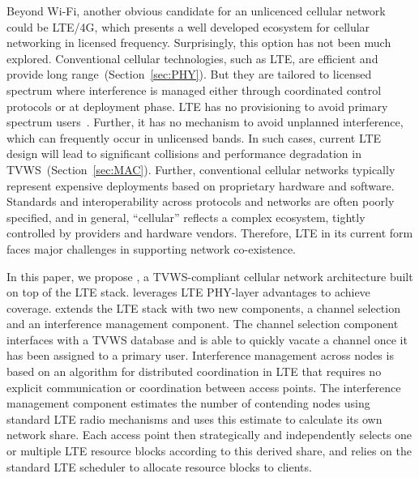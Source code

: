 Beyond Wi-Fi, another obvious candidate for an unlicenced cellular network could be LTE/4G, which presents a well developed ecosystem for cellular networking in licensed frequency. 
Surprisingly, this option has not been much explored. 
Conventional cellular technologies, such as LTE, are efficient and provide long range~(Section~\ref{sec:PHY}). 
But they are tailored to licensed spectrum where interference is managed either through coordinated control protocols or at deployment phase. 
LTE has no provisioning to avoid primary spectrum users~\cite{etsi_tvws}. 
Further, it has no mechanism to avoid unplanned interference, which can frequently occur in unlicensed bands.
In such cases, current LTE design will lead to significant collisions and performance degradation in TVWS~(Section~\ref{sec:MAC}).  
Further, conventional cellular networks typically represent expensive deployments based on proprietary hardware and software.
Standards and interoperability across protocols and networks are often poorly specified, 
and in general, ``cellular'' reflects a complex ecosystem, tightly controlled by providers and hardware vendors. 
Therefore, LTE in its current form faces major challenges in supporting network co-existence. 


In this paper, we propose {\em \cf}, a TVWS-compliant cellular network architecture built on top of the LTE stack. 
\cf leverages LTE PHY-layer advantages to achieve coverage. 
\cf extends the LTE stack with two new components, a channel selection and an interference management component. 
The channel selection component interfaces with a TVWS database and is able to quickly vacate a channel once it has been assigned to a primary user. 
Interference management across \cf nodes is based on an algorithm 
 for distributed coordination in LTE that requires no explicit communication or coordination between access points.
The interference management component estimates the number of contending nodes using standard LTE radio mechanisms and uses this estimate to calculate its own network share. Each access point then strategically and independently selects one or multiple LTE resource blocks according to this derived share, 
and relies on the standard LTE scheduler to allocate resource blocks to clients.  



